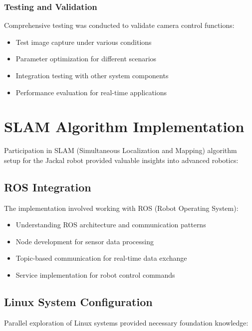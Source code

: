 \documentclass{book}
\begin{document}
\subsubsection{Testing and Validation}
\par\noindent Comprehensive testing was conducted to validate camera control functions:

\begin{itemize}
\item Test image capture under various conditions
\item Parameter optimization for different scenarios
\item Integration testing with other system components
\item Performance evaluation for real-time applications
\end{itemize}

\section{SLAM Algorithm Implementation}
\par\noindent Participation in SLAM (Simultaneous Localization and Mapping) algorithm setup for the Jackal robot provided valuable insights into advanced robotics:

\subsection{ROS Integration}
\par\noindent The implementation involved working with ROS (Robot Operating System):

\begin{itemize}
\item Understanding ROS architecture and communication patterns
\item Node development for sensor data processing
\item Topic-based communication for real-time data exchange
\item Service implementation for robot control commands
\end{itemize}

\subsection{Linux System Configuration}
\par\noindent Parallel exploration of Linux systems provided necessary foundation knowledge:
\end{document}
